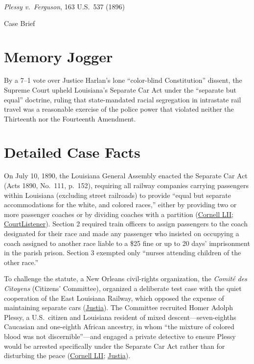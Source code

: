 \documentclass[12pt]{article}
\begin{document}
\begin{center}
{\LARGE \textit{Plessy v.\ Ferguson}, 163 U.S.\ 537 (1896)\par}
\vspace{0.8em}
{\large Case Brief\par}
\end{center}
\vspace{1em}

\section{Memory Jogger}

By a 7--1 vote over Justice Harlan's lone ``color-blind Constitution'' dissent, the Supreme Court upheld Louisiana's Separate Car Act under the ``separate but equal'' doctrine, ruling that state-mandated racial segregation in intrastate rail travel was a reasonable exercise of the police power that violated neither the Thirteenth nor the Fourteenth Amendment.

\section{Detailed Case Facts}

On July 10, 1890, the Louisiana General Assembly enacted the Separate Car Act (Acts 1890, No.\ 111, p.\ 152), requiring all railway companies carrying passengers within Louisiana (excluding street railroads) to provide ``equal but separate accommodations for the white, and colored races,'' either by providing two or more passenger coaches or by dividing coaches with a partition (\href{https://www.law.cornell.edu/supremecourt/text/163/537}{Cornell LII}; \href{https://www.courtlistener.com/opinion/94508/plessy-v-ferguson/}{CourtListener}). Section 2 required train officers to assign passengers to the coach designated for their race and made any passenger who insisted on occupying a coach assigned to another race liable to a \$25 fine or up to 20 days' imprisonment in the parish prison. Section 3 exempted only ``nurses attending children of the other race.''

To challenge the statute, a New Orleans civil-rights organization, the \textit{Comit\'e des Citoyens} (Citizens' Committee), organized a deliberate test case with the quiet cooperation of the East Louisiana Railway, which opposed the expense of maintaining separate cars (\href{https://supreme.justia.com/cases/federal/us/163/537/}{Justia}). The Committee recruited Homer Adolph Plessy, a U.S.\ citizen and Louisiana resident of mixed descent---seven-eighths Caucasian and one-eighth African ancestry, in whom ``the mixture of colored blood was not discernible''---and engaged a private detective to ensure Plessy would be arrested specifically under the Separate Car Act rather than for disturbing the peace (\href{https://www.law.cornell.edu/supremecourt/text/163/537}{Cornell LII}; \href{https://supreme.justia.com/cases/federal/us/163/537/}{Justia}).
\end{document}
